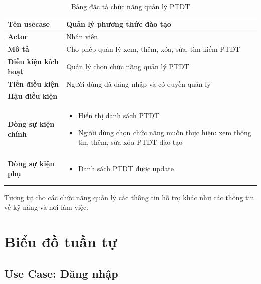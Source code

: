 \documentclass[report.tex]{subfiles}
\begin{document}
\begin{table}[!ht]
\begin{longtable}{|p{4cm}|p{12cm}|}
\hline
\textbf{Tên usecase} & \textbf{Quản lý phương thức đào tạo} \\
\hline
\textbf{Actor} & Nhân viên\\
\hline
\textbf{Mô tả} & Cho phép quản lý xem, thêm, xóa, sửa, tìm kiếm PTDT \\
\hline
\textbf{Điều kiện kích hoạt} & Quản lý chọn chức năng quản lý PTDT \\
\hline
\textbf{Tiền điều kiện} & Người dùng đã đăng nhập và có quyền quản lý \\
\hline
\textbf{Hậu điều kiện} & \\
\hline
\textbf{Dòng sự kiện chính} &
\begin{itemize}[noitemsep]
  \item Hiển thị danh sách PTDT
  \item Người dùng chọn chức năng muốn thực hiện: xem thông tin, thêm, sửa xóa PTDT đào tạo
\end{itemize}\\
\hline
\textbf{Dòng sự kiện phụ} & 
\begin{itemize}[noitemsep]
  \item Danh sách PTDT được update
\end{itemize}\\
\hline
\caption{Bảng đặc tả chức năng quản lý PTDT}
\end{longtable}
\end{table}
\FloatBarrier

Tương tự cho các chức năng quản lý các thông tin hỗ trợ khác như
các thông tin về kỹ năng và nơi làm việc.

\section{Biểu đồ tuần tự}

\subsection{Use Case: Đăng nhập}
\end{document}
